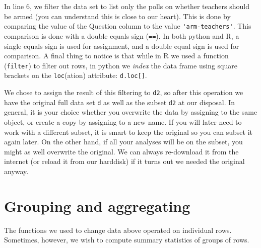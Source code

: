   
In line 6, we filter the data set to list only the polls on whether teachers should be armed
(you can understand this is close to our heart).
This is done by comparing the value of the Question column to the value \verb+'arm-teachers'+.
This comparison is done with a double equals sign (\verb+==+).
In both python and R, a single equals sign is used for assignment,
and a double equal sign is used for comparison.
A final thing to notice is that while in R we used a function (\verb+filter+) to filter out rows,
in python we \emph{index} the data frame using square brackets on the \verb+loc+(ation) attribute: \verb+d.loc[]+.

We chose to assign the result of this filtering to \verb+d2+,
so after this operation we have the original full data set \verb+d+ as well as the subset \verb+d2+ at our disposal.
In general, it is your choice whether you overwrite the data by assigning to the same object,
or create a copy by assigning to a new name.
If you will later need to work with a different subset, it is smart to keep the original so you can subset it again later.
On the other hand, if all your analyses will be on the subset, you might as well overwrite the original.
We can always re-download it from the internet (or reload it from our harddisk) if it turns out we needed the original anyway. 



\section{Grouping and aggregating}

The functions we used to change data above operated on individual rows.
Sometimes, however, we wish to compute summary statistics of groups of rows.

